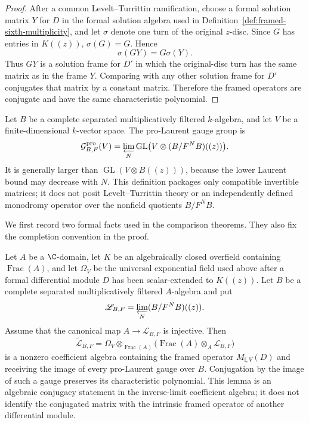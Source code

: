 \begin{proof}
After a common Levelt--Turrittin ramification, choose a formal solution matrix
\(Y\) for \(D\) in the formal solution algebra used in
Definition~\ref{def:framed-sixth-multiplicity}, and let \(\sigma\) denote one
turn of the original \(z\)-disc.  Since \(G\) has entries in
\(K(\!(z)\!)\), \(\sigma(G)=G\).  Hence
\[
 \sigma(GY)=G\sigma(Y).
\]
Thus \(GY\) is a solution frame for \(D'\) in which the original-disc turn has
the same matrix as in the frame \(Y\).  Comparing with any other solution frame
for \(D'\) conjugates that matrix by a constant matrix.  Therefore the framed
operators are conjugate and have the same characteristic polynomial.
\end{proof}

\begin{definition}
\label{def:pro-laurent-gauge-group}
Let \(B\) be a complete separated multiplicatively filtered \(k\)-algebra,
and let \(V\) be a finite-dimensional \(k\)-vector space.  The
pro-Laurent gauge group is
\[
 \mathcal G^{\rm pro}_{B,F}(V)=
 \varprojlim_N\operatorname{GL}
 \bigl(V\otimes(B/F^NB)((z))\bigr).
\]
It is generally larger than
\(\operatorname{GL}(V\otimes B((z)))\), because the lower Laurent bound may
decrease with \(N\).  This definition packages only compatible invertible
matrices; it does not posit Levelt--Turrittin theory or an independently
defined monodromy operator over the nonfield quotients \(B/F^NB\).
\end{definition}

We first record two formal facts used in the comparison theorems.  They also
fix the completion convention in the proof.

\begin{lemma}
\label{lem:pv-base-change}
Let \(A\) be a \(\C\)-domain, let \(K\) be an algebraically closed overfield
containing \(\operatorname{Frac}(A)\), and let \(\Omega_V\) be the universal
exponential field used above after a formal differential module \(D\) has
been scalar-extended to \(K((z))\).  Let \(B\) be a complete separated
multiplicatively filtered \(A\)-algebra and put
\[
 \mathscr L_{B,F}=\varprojlim_N(B/F^NB)((z)).
\]
Assume that the canonical map \(A\to\mathscr L_{B,F}\) is injective.  Then
\[
 \widetilde{\mathscr L}_{B,F}
 =\Omega_V\otimes_{\operatorname{Frac}(A)}
   \bigl(\operatorname{Frac}(A)\otimes_A\mathscr L_{B,F}\bigr)
 \tag{4.0d}
 \label{eq:scalar-extended-pro-laurent-ring}
\]
is a nonzero coefficient algebra containing the framed operator
\(M_{\mathrm f,V}(D)\) and receiving the image of every pro-Laurent gauge
over \(B\).  Conjugation by the image of such a gauge preserves its
characteristic polynomial.  This lemma is an algebraic conjugacy statement in
the inverse-limit coefficient algebra; it does not identify the conjugated
matrix with the intrinsic framed operator of another differential module.
\end{lemma}

